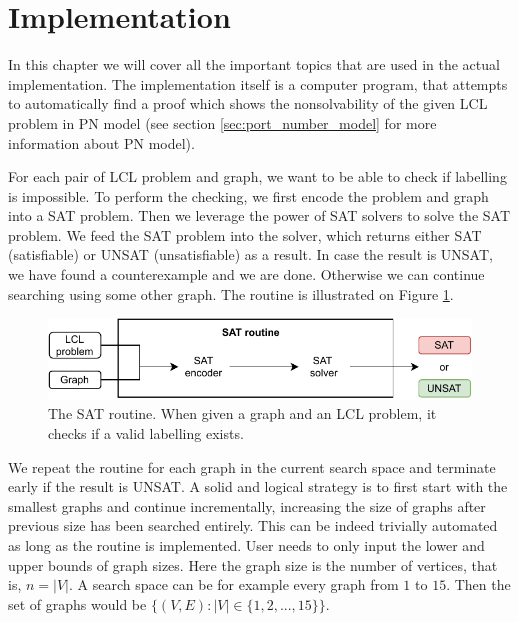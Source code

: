 
\section{Implementation} \label{sec:implementation}
In this chapter we will cover all the important topics that are used in the actual implementation.
The implementation itself is a computer program, that attempts to automatically find a proof which shows the nonsolvability of the given LCL problem in PN model (see section \ref{sec:port_number_model} for more information about PN model).

For each pair of LCL problem and graph, we want to be able to check if labelling is impossible.
To perform the checking, we first encode the problem and graph into a SAT problem.
Then we leverage the power of SAT solvers to solve the SAT problem.
We feed the SAT problem into the solver, which returns either SAT (satisfiable) or UNSAT (unsatisfiable) as a result.
In case the result is UNSAT, we have found a counterexample and we are done.
Otherwise we can continue searching using some other graph.
The routine is illustrated on Figure \ref{fig:implementation:idea:1}.

\begin{figure}[H]
\centering
\includegraphics[]{diagrams/implementation_idea_diagram2.pdf}
\caption{The SAT routine. When given a graph and an LCL problem, it checks if a valid labelling exists.}
\label{fig:implementation:idea:1}
\end{figure}

We repeat the routine for each graph in the current search space and terminate early if the result is UNSAT.
A solid and logical strategy is to first start with the smallest graphs and continue incrementally, increasing the size of graphs  after previous size has been searched entirely.
This can be indeed trivially automated as long as the routine is implemented.
User needs to only input the lower and upper bounds of graph sizes.
Here the graph size is the number of vertices, that is, $n=|V|$.
A search space can be for example every graph from $1$ to $15$.
Then the set of graphs would be $\{(V, E) : |V| \in \{1, 2, ..., 15\} \}$.

